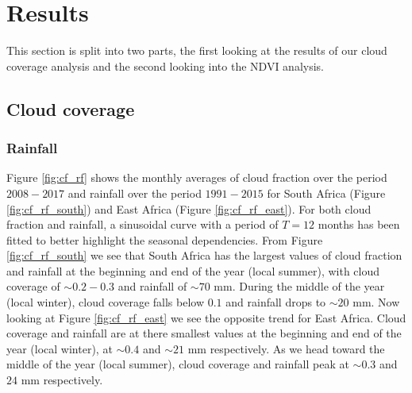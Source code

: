 \section{Results}
This section is split into two parts, the first looking at the results
of our cloud coverage analysis and the second looking into the NDVI
analysis.
\subsection{Cloud coverage}
\subsubsection{Rainfall}
Figure \ref{fig:cf_rf} shows the monthly averages of cloud fraction over the
period $2008-2017$ and rainfall over the period $1991-2015$ for South Africa
(Figure \ref{fig:cf_rf_south}) and East Africa (Figure
\ref{fig:cf_rf_east}). For both cloud fraction and rainfall, a sinusoidal curve
with a period of $T=12$ months has been fitted to better highlight the seasonal
dependencies. From Figure \ref{fig:cf_rf_south} we see that South Africa has the
largest values of cloud fraction and rainfall at the beginning and end of the
year (local summer), with cloud coverage of ${\sim}0.2-0.3$ and rainfall of
${\sim}70$ mm. During the middle of the year (local winter), cloud coverage falls
below $0.1$ and rainfall drops to ${\sim}20$ mm. Now looking at Figure
\ref{fig:cf_rf_east} we see the opposite trend for East Africa. Cloud coverage
and rainfall are at there smallest values at the beginning and end of the year
(local winter), at ${\sim}0.4$ and ${\sim}21$ mm respectively. As we head toward the
middle of the year (local summer), cloud coverage and rainfall peak at
${\sim}0.3$ and $24$ mm respectively.
